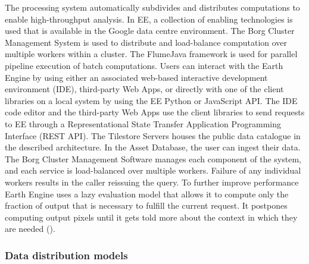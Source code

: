 The processing system automatically subdivides and distributes computations to enable high-throughput analysis. In EE, a collection of enabling technologies is used that is available in the Google data centre environment. The Borg Cluster Management System is used to distribute and load-balance computation over multiple workers within a cluster. The FlumeJava framework is used for parallel pipeline execution of batch computations.
Users can interact with the Earth Engine by using either an associated web-based interactive development environment (IDE), third-party Web Apps, or directly with one of the client libraries on a local system by using the EE Python or JavaScript API.
The IDE code editor and the third-party Web Apps use the client libraries to send requests to EE through a Representational State Transfer Application Programming Interface (REST API). 
The Tilestore Servers houses the public data catalogue in the described architecture. In the Asset Database, the user can ingest their data. 
The Borg Cluster Management Software manages each component of the system, and each service is load-balanced over multiple workers. Failure of any individual workers results in the caller reissuing the query. 
To further improve performance Earth Engine uses a lazy evaluation model that allows it to compute only the fraction of output that is necessary to fulfill the current request. It postpones computing output pixels until it gets told more about the context in which they are needed (\cite{gorelick2017google}).

\subsubsection{Data distribution models}


